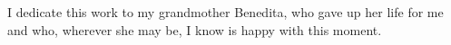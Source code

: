

I dedicate this work to my grandmother Benedita, who gave up her life for me and who, wherever she may be, I know is happy with this moment.

